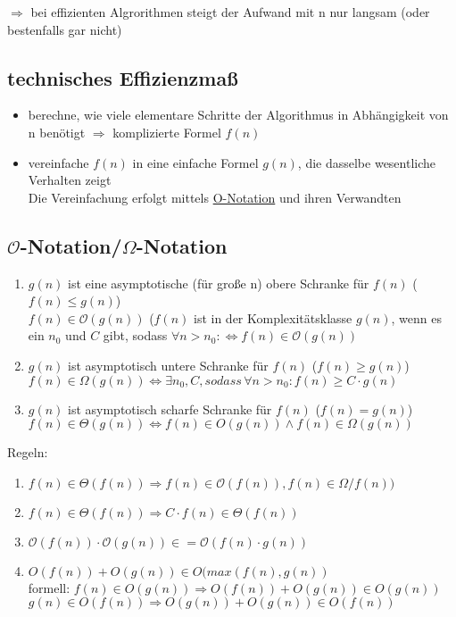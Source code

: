 \documentclass{article}
\begin{document}
\begin{itemize}
		$\Rightarrow$ bei effizienten Algrorithmen steigt der Aufwand mit n nur langsam (oder bestenfalls gar nicht)
		
		\subsection{technisches Effizienzmaß}
		\begin{itemize}
			\item berechne, wie viele elementare Schritte der Algorithmus in Abhängigkeit von n benötigt $\Rightarrow$ komplizierte Formel $f(n)$
			\item vereinfache $f(n)$ in eine einfache Formel $g(n)$, die dasselbe wesentliche Verhalten zeigt  \\
			Die Vereinfachung erfolgt mittels \underline{O-Notation} und ihren Verwandten
		\end{itemize}
		
		\subsection{$\mathcal{O}$-Notation/$\Omega$-Notation}
		\begin{enumerate}
			\item $g(n)$ ist eine asymptotische (für große n) obere Schranke für $f(n)$ ($f(n) \leq g(n)$) \\
			$f(n) \in \mathcal{O}(g(n))$ ($f(n)$ ist in der Komplexitätsklasse $g(n)$, wenn es ein $n_0$ und $C$ gibt, sodass $\forall n > n_0: \Leftrightarrow f(n) \in \mathcal{O}(g(n))$
			
			\item $g(n)$ ist asymptotisch untere Schranke für $f(n)$ ($f(n) \geq g(n)$) \\
			$f(n) \in \Omega(g(n)) \Leftrightarrow \exists n_0, C , sodass\, \forall n>n_0: f(n) \geq C \cdot g(n)$
			\item $g(n)$ ist  asymptotisch scharfe Schranke für $f(n)$ ($f(n) = g(n)$) \\
			$f(n) \in \Theta(g(n)) \Leftrightarrow f(n) \in O(g(n)) \wedge f(n) \in \Omega(g(n))$
		\end{enumerate}
		Regeln:
		\begin{enumerate}
			\item $f(n) \in \Theta(f(n)) \Rightarrow f(n) \in \mathcal{O}(f(n)), f(n) \in \Omega/f(n))$
			\item $f(n) \in \Theta(f(n)) \Rightarrow C \cdot f(n) \in \Theta(f(n))$
			\item $\mathcal{O}(f(n)) \cdot \mathcal{O}(g(n)) \in = \mathcal{O}(f(n) \cdot g(n))$
			\item $O(f(n)) + O(g(n)) \in O(max(f(n),g(n))$ \\
			formell: $f(n) \in O(g(n)) \Rightarrow O(f(n)) + O(g(n)) \in O(g(n))$
						$g(n) \in O(f(n)) \Rightarrow O(g(n)) + O(g(n)) \in O(f(n))$
			

\end{enumerate}
\end{itemize}
\end{document}
